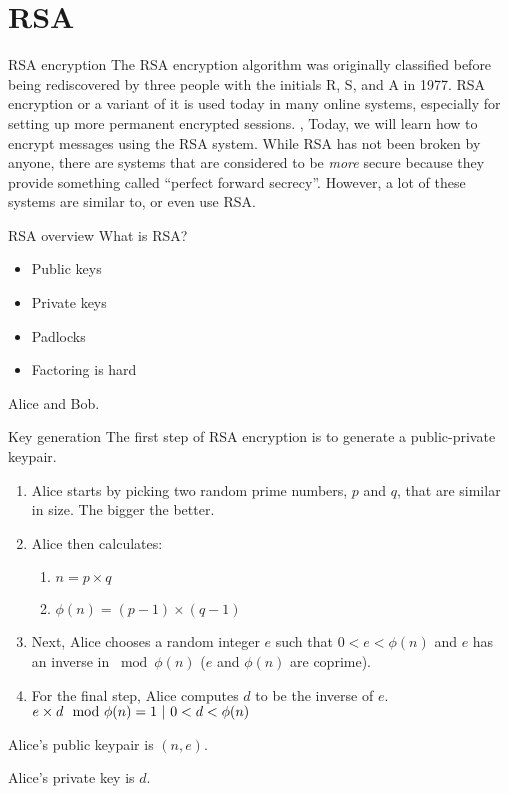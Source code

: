 \section{RSA}
\begin{namedframe}{RSA encryption}
	The RSA encryption algorithm was originally classified before being rediscovered by three people with the initials R, S, and A in 1977.
	RSA encryption or a variant of it is used today in many online systems, especially for setting up more permanent encrypted sessions.
	\sep
	Today, we will learn how to encrypt messages using the RSA system.
	\vertspace
	While RSA has not been broken by anyone, there are systems that are considered to be \emph{more} secure because they provide something called ``perfect forward secrecy''. However, a lot of these systems are similar to, or even use RSA.
\end{namedframe}
\begin{namedframe}{RSA overview}
	What is RSA?
	\begin{itemize}[<+(1)->]
		\item Public keys
		\item Private keys
		\item Padlocks
		\item Factoring is hard
	\end{itemize}
	\pause
	Alice and Bob.
\end{namedframe}
\begin{namedframe}{Key generation}
	The first step of RSA encryption is to generate a public-private keypair.
	\begin{enumerate}[<+(1)->]
		\item Alice starts by picking two random prime numbers, $p$ and $q$, that are similar in size. The bigger the better.
		\item Alice then calculates:
			\begin{enumerate}
				\item $n = p \times q$
				\item $\phi(n) = (p - 1) \times (q - 1)$
			\end{enumerate}
		\item Next, Alice chooses a random integer $e$ such that $0 < e < \phi(n)$ and $e$ has an inverse in $\bmod \phi(n)$ ($e$ and $\phi(n)$ are coprime).
		\item For the final step, Alice computes $d$ to be the inverse of $e$. $e \times d \mod \phi(n) = 1 \ |\  0 < d < \phi(n)$
	\end{enumerate}
	\pause
	Alice's public keypair is $(n, e)$.

	Alice's private key is $d$.
\end{namedframe}

